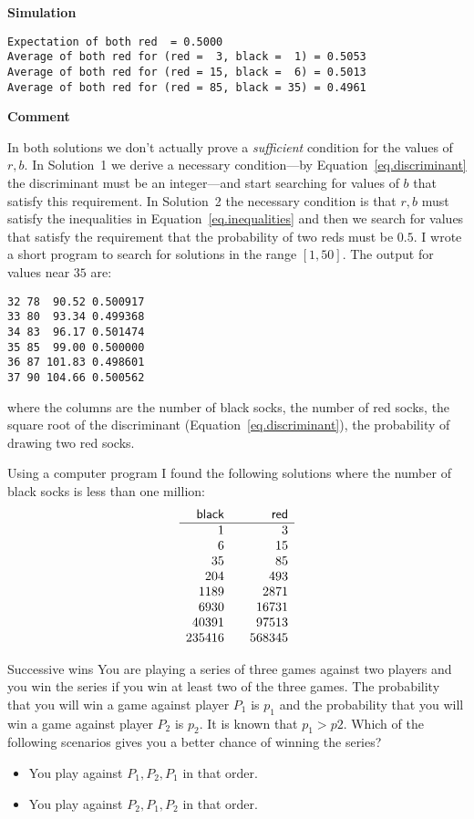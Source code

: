 \medskip
\textbf{Simulation}
\begin{verbatim}
Expectation of both red  = 0.5000
Average of both red for (red =  3, black =  1) = 0.5053
Average of both red for (red = 15, black =  6) = 0.5013
Average of both red for (red = 85, black = 35) = 0.4961
\end{verbatim}

\textbf{Comment}

In both solutions we don't actually prove a \emph{sufficient} condition for the values of $r,b$. In Solution~1 we derive a necessary condition---by Equation~\ref{eq.discriminant} the discriminant must be an integer---and start searching for values of $b$ that satisfy this requirement. In Solution~2 the necessary condition is that $r,b$ must satisfy the inequalities in Equation~\ref{eq.inequalities} and then we search for values that satisfy the requirement that the probability of two reds must be $0.5$. I wrote a short program to search for solutions in the range $[1,50]$. The output for values near $35$ are:
\begin{verbatim}
32 78  90.52 0.500917
33 80  93.34 0.499368
34 83  96.17 0.501474
35 85  99.00 0.500000
36 87 101.83 0.498601
37 90 104.66 0.500562
\end{verbatim}
where the columns are the number of black socks, the number of red socks, the square root of the discriminant (Equation~\ref{eq.discriminant}), the probability of drawing two red socks.

Using a computer program I found the following solutions where the number of black socks is less than one million:
\[
\begin{array}{r@{\hspace{2em}}r}
\textsf{black} & \textsf{red}\\\hline
1 & 3 \\
6 & 15\\
35 &  85\\
204 &  493\\
1189 &  2871\\
6930 & 16731\\
40391 &  97513\\
235416 & 568345
\end{array}
\]


\begin{prob}{Successive wins}
You are playing a series of three games against two players and you win the series if you win at least two of the three games. The probability that you will win a game against player $P_1$ is $p_1$ and the probability that you will win a game against player $P_2$ is $p_2$. It is known that $p_1>p2$. Which of the following scenarios gives you a better chance of winning the series?
\begin{itemize}
\item You play against $P_1,P_2,P_1$ in that order.
\item You play against $P_2,P_1,P_2$ in that order.
\end{itemize}
\end{prob}

